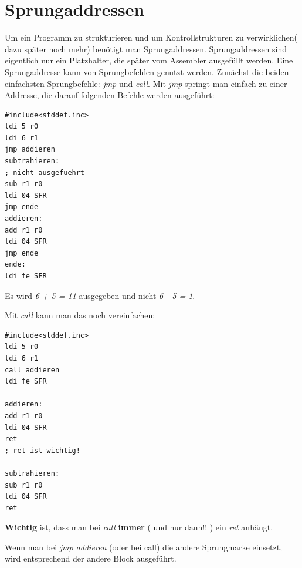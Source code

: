 \documentclass[a4paper,12pt,oneside]{scrreprt}
\begin{document}
\section{Sprungaddressen}

Um ein Programm zu strukturieren und um Kontrollstrukturen zu verwirklichen( dazu später noch mehr) benötigt man Sprungaddressen.  
Sprungaddressen sind eigentlich nur ein Platzhalter, die später vom Assembler ausgefüllt werden.
Eine Sprungaddresse kann von Sprungbefehlen genutzt werden. Zunächst die beiden einfachsten Sprungbefehle: \textit{jmp} und \textit{call}.
Mit \textit{jmp} springt man einfach zu einer Addresse, die darauf folgenden Befehle werden ausgeführt:

\begin{lstlisting}[frame=single]
#include<stddef.inc>
ldi 5 r0
ldi 6 r1
jmp addieren
subtrahieren:
; nicht ausgefuehrt
sub r1 r0
ldi 04 SFR
jmp ende
addieren:
add r1 r0
ldi 04 SFR
jmp ende
ende:
ldi fe SFR
\end{lstlisting}

Es wird \textit{6 + 5 = 11} ausgegeben und nicht \textit{6 - 5 = 1}.

Mit \textit{call} kann man das noch vereinfachen:

\begin{lstlisting}[frame=single]
#include<stddef.inc>
ldi 5 r0
ldi 6 r1
call addieren
ldi fe SFR

addieren:
add r1 r0
ldi 04 SFR
ret
; ret ist wichtig!

subtrahieren:
sub r1 r0
ldi 04 SFR
ret
\end{lstlisting}

\textbf{Wichtig} ist, dass man bei \textit{call} \textbf{immer} ( und nur dann!! )  ein \textit{ret} anhängt.

Wenn man bei \textit{jmp addieren} (oder bei call) die andere Sprungmarke einsetzt, wird entsprechend der andere Block ausgeführt.
\end{document}
